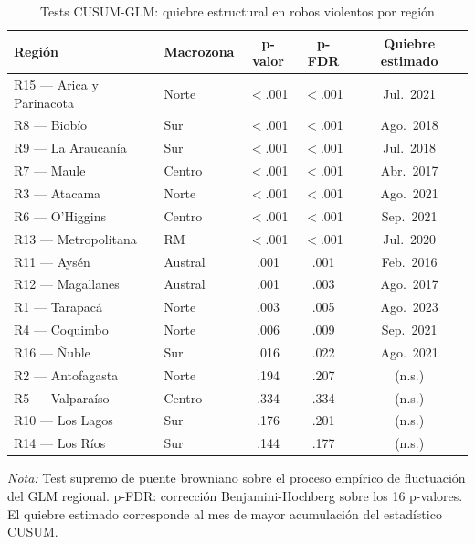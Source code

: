 \documentclass[12pt,a4paper]{article}
\newcommand{\tablenote}[1]{%
  \vspace{2pt}%
  \begin{minipage}{\linewidth}%
    \footnotesize\textit{Nota:} #1%
  \end{minipage}%
}
\begin{document}
\begin{table}[H]
\centering
\caption{Tests CUSUM-GLM: quiebre estructural en robos violentos por regi\'on}
\label{tab:cusum}
\footnotesize
\begin{tabular}{llccc}
\toprule
\textbf{Regi\'on} & \textbf{Macrozona} & \textbf{p-valor} & \textbf{p-FDR} & \textbf{Quiebre estimado} \\
\midrule
R15 --- Arica y Parinacota & Norte   & $<$.001  & $<$.001 & Jul.\ 2021 \\
R8 --- Biob\'io            & Sur     & $<$.001  & $<$.001 & Ago.\ 2018 \\
R9 --- La Araucan\'ia      & Sur     & $<$.001  & $<$.001 & Jul.\ 2018 \\
R7 --- Maule               & Centro  & $<$.001  & $<$.001 & Abr.\ 2017 \\
R3 --- Atacama             & Norte   & $<$.001  & $<$.001 & Ago.\ 2021 \\
R6 --- O'Higgins           & Centro  & $<$.001  & $<$.001 & Sep.\ 2021 \\
R13 --- Metropolitana      & RM      & $<$.001  & $<$.001 & Jul.\ 2020 \\
R11 --- Ays\'en            & Austral & .001     & .001    & Feb.\ 2016 \\
R12 --- Magallanes         & Austral & .001     & .003    & Ago.\ 2017 \\
R1 --- Tarapac\'a          & Norte   & .003     & .005    & Ago.\ 2023 \\
R4 --- Coquimbo            & Norte   & .006     & .009    & Sep.\ 2021 \\
R16 --- \~Nuble            & Sur     & .016     & .022    & Ago.\ 2021 \\
\midrule
R2 --- Antofagasta         & Norte   & .194     & .207    & (n.s.) \\
R5 --- Valpara\'iso        & Centro  & .334     & .334    & (n.s.) \\
R10 --- Los Lagos          & Sur     & .176     & .201    & (n.s.) \\
R14 --- Los R\'ios         & Sur     & .144     & .177    & (n.s.) \\
\bottomrule
\end{tabular}
\tablenote{Test supremo de puente browniano sobre el proceso emp\'irico de fluctuaci\'on
del GLM regional. p-FDR: correcci\'on Benjamini-Hochberg sobre los 16 p-valores. El
quiebre estimado corresponde al mes de mayor acumulaci\'on del estad\'istico CUSUM.}
\end{table}
\end{document}

